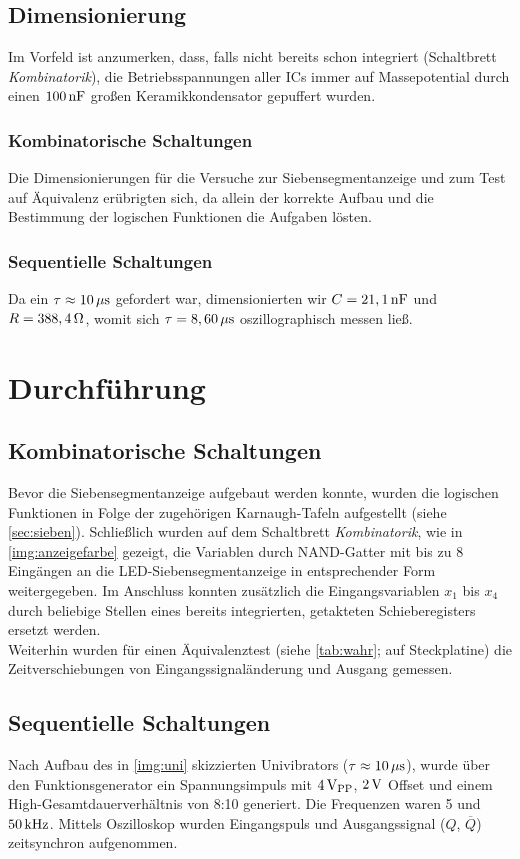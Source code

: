 \documentclass[numbers=noenddot,12pt,a4paper]{scrartcl}
\newcommand{\ix}[1]{_\text{#1}}
\newcommand{\nicht}[1]{\overline{#1}}
\begin{document}
\subsection{Dimensionierung}
Im Vorfeld ist anzumerken, dass, falls nicht bereits schon integriert (Schaltbrett \textit{Kombinatorik}), die Betriebsspannungen aller ICs immer auf Massepotential durch einen $\unit[100]{nF}$ großen Keramikkondensator gepuffert wurden.
\subsubsection{Kombinatorische Schaltungen}
Die Dimensionierungen für die Versuche zur Siebensegmentanzeige und zum Test auf Äquivalenz erübrigten sich, da allein der korrekte Aufbau und die Bestimmung der logischen Funktionen die Aufgaben lösten.
\subsubsection{Sequentielle Schaltungen}
Da ein $\tau\approx\unit[10]{\mu s}$ gefordert war, dimensionierten wir $C=\unit[21,1]{nF}$ und $R=\unit[388,4]{\Omega}$, womit sich $\tau=\unit[8,60]{\mu s}$ oszillographisch messen ließ.
\section{Durchführung}
\subsection{Kombinatorische Schaltungen}
Bevor die Siebensegmentanzeige aufgebaut werden konnte, wurden die logischen Funktionen in Folge der zugehörigen Karnaugh-Tafeln aufgestellt (siehe \ref{sec:sieben}). Schließlich wurden auf dem Schaltbrett \textit{Kombinatorik}, wie in \ref{img:anzeigefarbe} gezeigt, die Variablen durch NAND-Gatter mit bis zu 8 Eingängen an die LED-Siebensegmentanzeige in entsprechender Form weitergegeben. Im Anschluss konnten zusätzlich die Eingangsvariablen $x_1$ bis $x_4$ durch beliebige Stellen eines bereits integrierten, getakteten Schieberegisters ersetzt werden. \\
Weiterhin wurden für einen Äquivalenztest (siehe \ref{tab:wahr}; auf Steckplatine) die Zeitverschiebungen von Eingangssignaländerung und Ausgang gemessen.
\subsection{Sequentielle Schaltungen}
Nach Aufbau des in \ref{img:uni} skizzierten Univibrators ($\tau\approx\unit[10]{\mu s}$), wurde über den Funktionsgenerator ein Spannungsimpuls mit $\unit[4]{V\ix{PP}}$, $\unit[2]{V}$ Offset und einem High-Gesamtdauerverhältnis von 8:10 generiert. Die Frequenzen waren 5 und $\unit[50]{kHz}$. Mittels Oszilloskop wurden Eingangspuls und Ausgangssignal ($Q$, $\nicht{Q}$) zeitsynchron aufgenommen.
\end{document}

